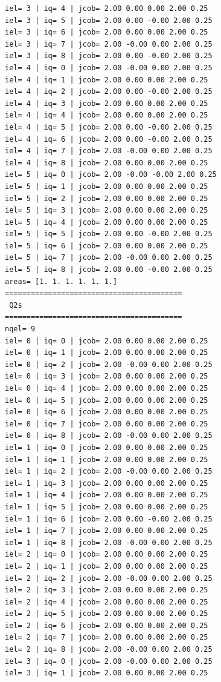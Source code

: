 \begin{tiny}
\begin{verbatim}
iel= 3 | iq= 4 | jcob= 2.00 0.00 0.00 2.00 0.25
iel= 3 | iq= 5 | jcob= 2.00 0.00 -0.00 2.00 0.25
iel= 3 | iq= 6 | jcob= 2.00 0.00 0.00 2.00 0.25
iel= 3 | iq= 7 | jcob= 2.00 -0.00 0.00 2.00 0.25
iel= 3 | iq= 8 | jcob= 2.00 0.00 -0.00 2.00 0.25
iel= 4 | iq= 0 | jcob= 2.00 -0.00 0.00 2.00 0.25
iel= 4 | iq= 1 | jcob= 2.00 0.00 0.00 2.00 0.25
iel= 4 | iq= 2 | jcob= 2.00 0.00 -0.00 2.00 0.25
iel= 4 | iq= 3 | jcob= 2.00 0.00 0.00 2.00 0.25
iel= 4 | iq= 4 | jcob= 2.00 0.00 0.00 2.00 0.25
iel= 4 | iq= 5 | jcob= 2.00 0.00 -0.00 2.00 0.25
iel= 4 | iq= 6 | jcob= 2.00 0.00 -0.00 2.00 0.25
iel= 4 | iq= 7 | jcob= 2.00 -0.00 0.00 2.00 0.25
iel= 4 | iq= 8 | jcob= 2.00 0.00 0.00 2.00 0.25
iel= 5 | iq= 0 | jcob= 2.00 -0.00 -0.00 2.00 0.25
iel= 5 | iq= 1 | jcob= 2.00 0.00 0.00 2.00 0.25
iel= 5 | iq= 2 | jcob= 2.00 0.00 0.00 2.00 0.25
iel= 5 | iq= 3 | jcob= 2.00 0.00 0.00 2.00 0.25
iel= 5 | iq= 4 | jcob= 2.00 0.00 0.00 2.00 0.25
iel= 5 | iq= 5 | jcob= 2.00 0.00 -0.00 2.00 0.25
iel= 5 | iq= 6 | jcob= 2.00 0.00 0.00 2.00 0.25
iel= 5 | iq= 7 | jcob= 2.00 -0.00 0.00 2.00 0.25
iel= 5 | iq= 8 | jcob= 2.00 0.00 -0.00 2.00 0.25
areas= [1. 1. 1. 1. 1. 1.]
=========================================
 Q2s
=========================================
nqel= 9
iel= 0 | iq= 0 | jcob= 2.00 0.00 0.00 2.00 0.25
iel= 0 | iq= 1 | jcob= 2.00 0.00 0.00 2.00 0.25
iel= 0 | iq= 2 | jcob= 2.00 -0.00 0.00 2.00 0.25
iel= 0 | iq= 3 | jcob= 2.00 0.00 0.00 2.00 0.25
iel= 0 | iq= 4 | jcob= 2.00 0.00 0.00 2.00 0.25
iel= 0 | iq= 5 | jcob= 2.00 0.00 0.00 2.00 0.25
iel= 0 | iq= 6 | jcob= 2.00 0.00 0.00 2.00 0.25
iel= 0 | iq= 7 | jcob= 2.00 0.00 0.00 2.00 0.25
iel= 0 | iq= 8 | jcob= 2.00 -0.00 0.00 2.00 0.25
iel= 1 | iq= 0 | jcob= 2.00 0.00 0.00 2.00 0.25
iel= 1 | iq= 1 | jcob= 2.00 0.00 0.00 2.00 0.25
iel= 1 | iq= 2 | jcob= 2.00 -0.00 0.00 2.00 0.25
iel= 1 | iq= 3 | jcob= 2.00 0.00 0.00 2.00 0.25
iel= 1 | iq= 4 | jcob= 2.00 0.00 0.00 2.00 0.25
iel= 1 | iq= 5 | jcob= 2.00 0.00 0.00 2.00 0.25
iel= 1 | iq= 6 | jcob= 2.00 0.00 -0.00 2.00 0.25
iel= 1 | iq= 7 | jcob= 2.00 0.00 0.00 2.00 0.25
iel= 1 | iq= 8 | jcob= 2.00 -0.00 0.00 2.00 0.25
iel= 2 | iq= 0 | jcob= 2.00 0.00 0.00 2.00 0.25
iel= 2 | iq= 1 | jcob= 2.00 0.00 0.00 2.00 0.25
iel= 2 | iq= 2 | jcob= 2.00 -0.00 0.00 2.00 0.25
iel= 2 | iq= 3 | jcob= 2.00 0.00 0.00 2.00 0.25
iel= 2 | iq= 4 | jcob= 2.00 0.00 0.00 2.00 0.25
iel= 2 | iq= 5 | jcob= 2.00 0.00 0.00 2.00 0.25
iel= 2 | iq= 6 | jcob= 2.00 0.00 0.00 2.00 0.25
iel= 2 | iq= 7 | jcob= 2.00 0.00 0.00 2.00 0.25
iel= 2 | iq= 8 | jcob= 2.00 -0.00 0.00 2.00 0.25
iel= 3 | iq= 0 | jcob= 2.00 -0.00 0.00 2.00 0.25
iel= 3 | iq= 1 | jcob= 2.00 0.00 0.00 2.00 0.25

\end{verbatim}
\end{tiny}
